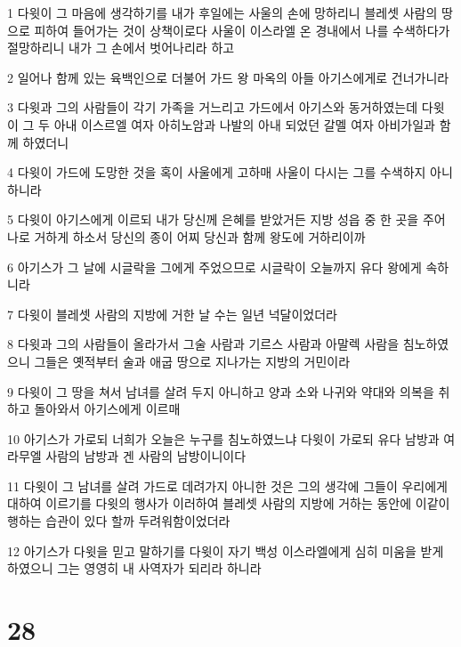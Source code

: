 \par 1 다윗이 그 마음에 생각하기를 내가 후일에는 사울의 손에 망하리니 블레셋 사람의 땅으로 피하여 들어가는 것이 상책이로다 사울이 이스라엘 온 경내에서 나를 수색하다가 절망하리니 내가 그 손에서 벗어나리라 하고
\par 2 일어나 함께 있는 육백인으로 더불어 가드 왕 마옥의 아들 아기스에게로 건너가니라
\par 3 다윗과 그의 사람들이 각기 가족을 거느리고 가드에서 아기스와 동거하였는데 다윗이 그 두 아내 이스르엘 여자 아히노암과 나발의 아내 되었던 갈멜 여자 아비가일과 함께 하였더니
\par 4 다윗이 가드에 도망한 것을 혹이 사울에게 고하매 사울이 다시는 그를 수색하지 아니하니라
\par 5 다윗이 아기스에게 이르되 내가 당신께 은혜를 받았거든 지방 성읍 중 한 곳을 주어 나로 거하게 하소서 당신의 종이 어찌 당신과 함께 왕도에 거하리이까
\par 6 아기스가 그 날에 시글락을 그에게 주었으므로 시글락이 오늘까지 유다 왕에게 속하니라
\par 7 다윗이 블레셋 사람의 지방에 거한 날 수는 일년 넉달이었더라
\par 8 다윗과 그의 사람들이 올라가서 그술 사람과 기르스 사람과 아말렉 사람을 침노하였으니 그들은 옛적부터 술과 애굽 땅으로 지나가는 지방의 거민이라
\par 9 다윗이 그 땅을 쳐서 남녀를 살려 두지 아니하고 양과 소와 나귀와 약대와 의복을 취하고 돌아와서 아기스에게 이르매
\par 10 아기스가 가로되 너희가 오늘은 누구를 침노하였느냐 다윗이 가로되 유다 남방과 여라무엘 사람의 남방과 겐 사람의 남방이니이다
\par 11 다윗이 그 남녀를 살려 가드로 데려가지 아니한 것은 그의 생각에 그들이 우리에게 대하여 이르기를 다윗의 행사가 이러하여 블레셋 사람의 지방에 거하는 동안에 이같이 행하는 습관이 있다 할까 두려워함이었더라
\par 12 아기스가 다윗을 믿고 말하기를 다윗이 자기 백성 이스라엘에게 심히 미움을 받게 하였으니 그는 영영히 내 사역자가 되리라 하니라

\chapter{28}

